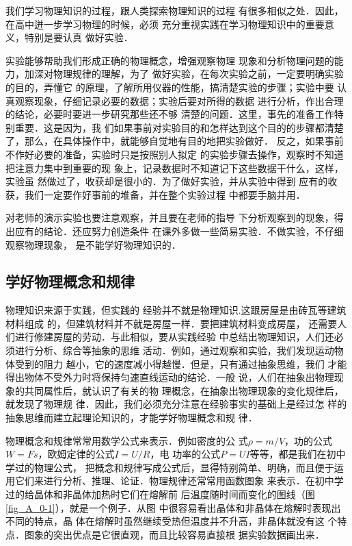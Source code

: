     我们学习物理知识的过程，跟人类探索物理知识的过程
有很多相似之处．因此，在高中迸一步学习物理的时候，必须
充分重视实践在学习物理知识中的重要意义，特别是要认真
做好实验．

    实验能够帮助我们形成正确的物理概念，增强观察物理
现象和分析物理问题的能力，加深对物理规律的理解，为了
做好实验，在每次实验之前，一定要明确实验的目的，弄懂它
的原理，了解所用仪器的性能，搞清楚实验的步骤；实验中要
认真观察现象，仔细记录必要的数据；实验后要对所得的数据
进行分析，作出合理的结论，必要时要进一步研究那些还不够
清楚的问题．这里，事先的准备工作特别重要．这是因为，我
们如果事前对实验目的和怎样达到这个目的的步骤都清楚
了，那么，在具体操作中，就能够自觉地有目的地把实验做好．
反之，如果事前不作好必要的准备，实验时只是按照别人拟定
的实验步骤去操作，观察时不知道把注意力集中到重要的现
象上，记录数据时不知道记下这些数据干什么，这样，实验虽
然做过了，收获却是很小的．为了做好实验，并从实验中得到
应有的收获，我们一定要作好事前的堆备，并在整个实验过程
中都要手脑并用．

    对老师的演示实验也要注意观察，并且要在老师的指导
下分析观察到的现象，得出应有的结论．还应努力创造条件
在课外多做一些简易实验．不做实验，不仔细观察物理现象，
是不能学好物理知识的．

\subsection*{学好物理概念和规律}

物理知识来源于实践，但实践的
经验并不就是物理知识.这跟房屋是由砖瓦等建筑材料组成
的，但建筑材料并不就是房屋一样．要把建筑材料变成房屋，
还需要人们进行修建房屋的劳动．与此相似，要从实践经验
中总结出物理知识，人们还必须进行分析、综合等抽象的思维
活动．例如，通过观察和实验，我们发现运动物体受到的阻力
越小，它的速度减小得越慢．但是，只有通过抽象思维，我们
才能得出物体不受外力时将保持匀速直线运动的结论．一般
说，人们在抽象出物理现象的共同属性后，就认识了有关的物
理概念，在抽象出物理现象的变化规律后，就发现了物理规
律．因此，我们必须充分注意在经验事实的基础上是经过怎
样的抽象思维而建立起理论知识的，才能学好物理概念和规
律．

物理概念和规律常常用数学公式来表示．例如密度的公
式$\rho=m/V$，功的公式$W=Fs$，欧姆定律的公式$I=U/R$，电
功率的公式$P=UI$等等，都是我们在初中学过的物理公式，
把概念和规律写成公式后，显得特别简单、明确，而且便于运
用它们来进行分析、推理、论证．物理规律还常常用函数图象
来表示．在初中学过的给晶体和非晶体加热时它们在熔解前
后温度随时间而变化的图线（图 \ref{fig_A_0-1}），就是一个例子．从图
中很容易看出晶体和非晶体在熔解时表现出不同的特点，晶
体在熔解时虽然继续受热但温度并不升高，非晶体就没有这
个特点．图象的突出优点是它很直观，而且比较容易直接根
据实验数据画出来．


